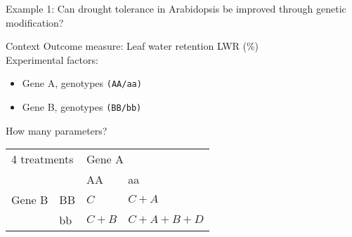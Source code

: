 \documentclass{beamer}
\begin{document}
\begin{frame}{Example 1: Can drought tolerance in Arabidopsis be improved through genetic modification?}

\begin{block}{Context}
  Outcome measure: Leaf water retention LWR (\%)\\
  Experimental factors:
    \begin{itemize}
     \item Gene A, genotypes \texttt{(AA/aa)}
     \item Gene B, genotypes \texttt{(BB/bb)}
    \end{itemize}
\end{block}
How many parameters?
        
\pause

\begin{center}
\begin{tabular}{|l | l | l | l | }
\toprule
  \multicolumn{2}{|l|}{4 treatments} & \multicolumn{2}{l|}{Gene A}\\
  \cmidrule(lr){3-4}
  \multicolumn{2}{|l|}{}  & AA & aa\\
 	    \midrule
      Gene B & BB & $C$ & $C+A$\\
      \cmidrule(lr){3-4}
 	    & bb & $C+B$ & $C+A+B+D$\\
	    \bottomrule
  \end{tabular}
\end{center}
 
\end{frame}
\end{document}

